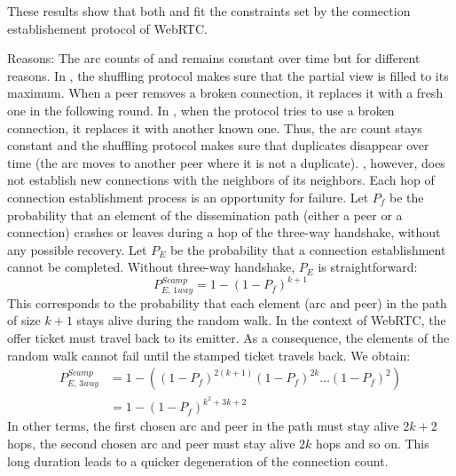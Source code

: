 \begin{asparadesc}
  These results show that both \SPRAY and \CYCLON fit the constraints set by the
  connection establishement protocol of WebRTC.

\item[Reasons:] The arc counts of \CYCLON and \SPRAY remains constant
  over time but for different reasons. In \CYCLON, the shuffling
  protocol makes sure that the partial view is filled to its
  maximum. When a peer removes a broken connection, it replaces it
  with a fresh one in the following round.  In \SPRAY, when the
  protocol tries to use a broken connection, it replaces it with
  another known one. Thus, the arc count stays constant and the
  shuffling protocol makes sure that duplicates disappear over time
  (the arc moves to another peer where it is not a duplicate).
  \SCAMP, however, does not establish new connections with the
  neighbors of its neighbors.  Each hop of connection establishment
  process is an opportunity for failure.  Let $P_f$ be the probability
  that an element of the dissemination path (either a peer or a
  connection) crashes or leaves during a hop of the three-way
  handshake, without any possible recovery. Let $P_E$ be the
  probability that a connection establishment cannot be
  completed. Without three-way handshake, $P_E$ is straightforward:
  \begin{equation} P_{E,\,1way}^{Scamp}=1-(1-
    P_f)^{k+1} \end{equation} This corresponds to the probability that
  each element (arc and peer) in the path of size $k+1$ stays alive
  during the random walk. In the context of WebRTC, the offer ticket
  must travel back to its emitter. As a consequence, the elements of
  the random walk cannot fail until the stamped ticket travels
  back. We obtain:
  \begin{align} P_{E,\,3way}^{Scamp} &=1 - ((1-P_f)^{2(k+1)} (1-P_f)^{2k}
                                       \ldots (1-P_f)^2) \nonumber \\
                                     &=1-(1-P_f)^{k^2+3k+2}
  \end{align}
  In other terms, the first chosen arc and peer in the path must stay
  alive $2k+2$ hops, the second chosen arc and peer must stay alive
  $2k$ hops and so on.  This long duration leads to a quicker
  degeneration of the connection count.



\end{asparadesc}
